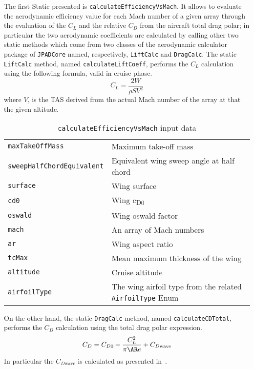 \bigskip
\noindent
The first \gls{Static} presented is \lstinline[language=Java]!calculateEfficiencyVsMach!. It allows to evaluate the aerodynamic efficiency value for each Mach number of a given array through the evaluation of the $C_{L}$ and the relative $C_{D}$ from the aircraft total drag polar; in particular the two aerodynamic coefficients are calculated by calling other two static methods which come from two classes of the aerodynamic calculator package of \lstinline[language=Java]!JPADCore! named, respectively, \lstinline[language=Java]!LiftCalc! and \lstinline[language=Java]!DragCalc!.
%
The static \lstinline[language=Java]!LiftCalc! method, named \lstinline[language=Java]!calculateLiftCoeff!, performs the $C_{L}$ calculation using the following formula, valid in cruise phase.
%
\begin{equation}
C_L=\frac{2W}{\rho S V^2}
\label{eqn:Lift.Equation}
\end{equation}
%
\noindent
where $V$, is the \gls{TAS} derived from the actual Mach number of the array at that the given altitude.
%
\begin{table}[b]
\begin{tabular}{p{7cm}p{7.5cm}}
\toprule
\lstinline[language=Java]!maxTakeOffMass! & Maximum take-off mass \\[0.1	cm]
\lstinline[language=Java]!sweepHalfChordEquivalent! & Equivalent wing sweep angle at half chord \\[0.1cm]
\lstinline[language=Java]!surface! & Wing surface \\[0.1cm]
\lstinline[language=Java]!cd0!	& Wing c\textsubscript{D0} \\[0.1cm]
\lstinline[language=Java]!oswald!	& Wing oswald factor \\[0.1cm]
\lstinline[language=Java]!mach!	& An array of Mach numbers \\[0.1cm]
\lstinline[language=Java]!ar!	& Wing aspect ratio \\[0.1cm]
\lstinline[language=Java]!tcMax! & Mean maximum thickness of the wing \\[0.1cm]
\lstinline[language=Java]!altitude! & Cruise altitude \\[0.1cm]
\lstinline[language=Java]!airfoilType! & The wing airfoil type from the related \lstinline[language=Java]!AirfoilType! \gls{Enum} \\
\bottomrule
\end{tabular}
\caption{ \lstinline[language=Java]!calculateEfficiencyVsMach! input data}
\label{table:Table1}
\end{table}
%
On the other hand, the static \lstinline[language=Java]!DragCalc! method, named \lstinline[language=Java]!calculateCDTotal!, performs the $C_{D}$ calculation using the total drag polar expression.
%
\begin{equation}
C_D=C_{D0}+\frac{C_L^2}{\pi \ensuremath{\AR} e}+C_{D\text{wave}}
\label{eqn:Drag.Total}
\end{equation}
%
\noindent
In particular the $C_{D\text{wave}}$ is calculated as presented in~\cite{hilton1951high}.

